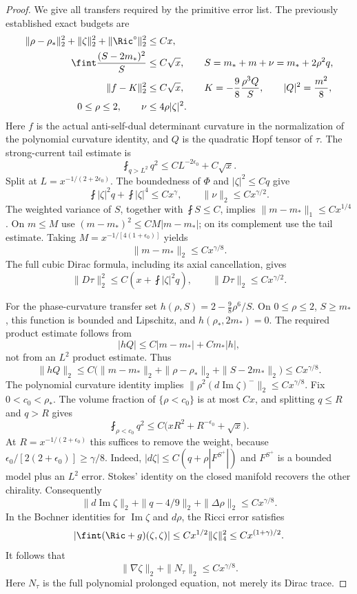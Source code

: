 \begin{proof}
We give all transfers required by the primitive error list. The
previously established exact budgets are
\begin{align*}
 \|\rho-\rho_*\|_2^2+\|\zeta\|_2^2+
 \|\Ric^\circ\|_2^2&\le Cx,\\
 \fint\frac{(S-2m_*)^2}{S}&\le C\sqrt{x},\qquad
 S=m_*+m+\nu=m_*+2\rho^2q,\\
 \|f-K\|_2^2&\le C\sqrt{x},\qquad
 K=-\frac98\frac{\rho^3Q}{S},\qquad |Q|^2=\frac{m^2}{8},\\
 0\le\rho\le2,\qquad \nu&\le4\rho|\zeta|^2.
\end{align*}
Here $f$ is the actual anti-self-dual determinant curvature in the
normalization of the polynomial curvature identity, and $Q$ is the
quadratic Hopf tensor of $\tau$. The strong-current tail estimate is
\[
 \fint_{q>L^2}q^2\le CL^{-2\epsilon_0}+C\sqrt{x}.
\]
Split at $L=x^{-1/(2+2\epsilon_0)}$. The boundedness of $\Phi$ and
$|\zeta|^2\le Cq$ give
\[
 \fint |\zeta|^2q+\fint|\zeta|^4\le Cx^\gamma,
 \qquad \|\nu\|_2\le Cx^{\gamma/2}.
\]
The weighted variance of $S$, together with $\fint S\le C$, implies
$\|m-m_*\|_1\le Cx^{1/4}$. On $m\le M$ use
$(m-m_*)^2\le CM|m-m_*|$; on its complement use the tail estimate.
Taking $M=x^{-1/[4(1+\epsilon_0)]}$ yields
\begin{equation}\label{eq:web-mass-rate}
 \|m-m_*\|_2\le Cx^{\gamma/8}.
\end{equation}
The full cubic Dirac formula, including its axial cancellation, gives
\[
 \|D\tau\|_2^2\le C\left(x+\fint|\zeta|^2q\right),
 \qquad \|D\tau\|_2\le Cx^{\gamma/2}.
\]

For the phase-curvature transfer set
$h(\rho,S)=2-\frac98\rho^6/S$. On $0\le\rho\le2$, $S\ge m_*$,
this function is bounded and Lipschitz, and
$h(\rho_*,2m_*)=0$. The required product estimate follows from
\[
 |hQ|\le C|m-m_*|+Cm_*|h|,
\]
not from an $L^2$ product estimate. Thus
\[
 \|hQ\|_2\le C\bigl(\|m-m_*\|_2+\|\rho-\rho_*\|_2+
                 \|S-2m_*\|_2\bigr)\le Cx^{\gamma/8}.
\]
The polynomial curvature identity implies
$\|\rho^2(d\operatorname{Im}\zeta)^-\|_2\le Cx^{\gamma/8}$.
Fix $0<c_0<\rho_*$. The volume fraction of $\{\rho<c_0\}$ is at
most $Cx$, and splitting $q\le R$ and $q>R$ gives
\[
 \fint_{\rho<c_0}q^2
 \le C\bigl(xR^2+R^{-\epsilon_0}+\sqrt{x}\bigr).
\]
At $R=x^{-1/(2+\epsilon_0)}$ this suffices to remove the weight,
because $\epsilon_0/[2(2+\epsilon_0)]\ge\gamma/8$.
Indeed, $|d\zeta|\le C(q+\rho|F^{S^+}|)$ and $F^{S^+}$ is a
bounded model plus an $L^2$ error. Stokes' identity on the closed
manifold recovers the other chirality. Consequently
\[
 \|d\operatorname{Im}\zeta\|_2+
 \|q-4/9\|_2+\|\Delta\rho\|_2\le Cx^{\gamma/8}.
\]
In the Bochner identities for $\operatorname{Im}\zeta$ and $d\rho$,
the Ricci error satisfies
\[
 \left|\fint(\Ric+g)(\zeta,\zeta)\right|
 \le Cx^{1/2}\|\zeta\|_4^2\le Cx^{(1+\gamma)/2}.
\]
It follows that
\begin{equation}\label{eq:web-full-prolongation-rate}
 \|\nabla\zeta\|_2+\|N_\tau\|_2\le Cx^{\gamma/8}.
\end{equation}
Here $N_\tau$ is the full polynomial prolonged equation, not merely
its Dirac trace.


\end{proof}
